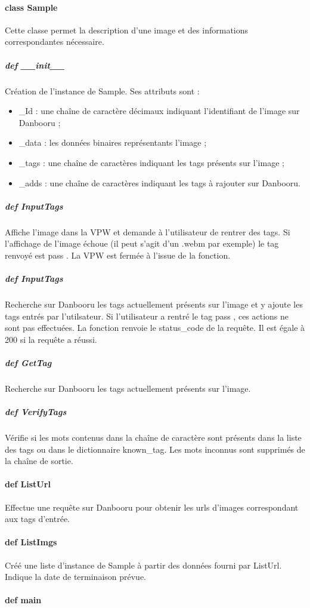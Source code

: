 \documentclass[a4paper,12pt]{article}
\begin{document}
\paragraph{class Sample}
Cette classe permet la description d'une image et des informations correspondantes nécessaire.
\subparagraph{def \_\_init\_\_}
Création de l'instance de Sample. Ses attributs sont :
\begin{itemize}
\item \_Id : une chaîne de caractère décimaux indiquant l'identifiant de l'image sur Danbooru ;
\item \_data : les données binaires représentants l'image ; 
\item \_tags : une chaîne de caractères indiquant les tags présents sur l'image ;
\item \_adds : une chaîne de caractères indiquant les tags à rajouter sur Danbooru.
\end{itemize}
\subparagraph{def InputTags}
Affiche l'image dans la VPW et demande à l'utilisateur de rentrer des tags. Si l'affichage de l'image échoue (il peut s'agit d'un .webm par exemple) le tag renvoyé est \og pass \fg. La VPW est fermée à l'issue de la fonction.
\subparagraph{def InputTags}
Recherche sur Danbooru les tags actuellement présents sur l'image et y ajoute les tags entrés par l'utilsateur. Si l'utilisateur a rentré le tag \og pass \fg, ces actions ne sont pas effectuées. La fonction renvoie le status\_code de la requête. Il est égale à 200 si la requête a réussi. 
\subparagraph{def GetTag}
Recherche sur Danbooru les tags actuellement présents sur l'image.
\subparagraph{def VerifyTags}
Vérifie si les mots contenus dans la chaîne de caractère sont présents dans la liste des tags ou dans le dictionnaire known\_tag. Les mots inconnus sont supprimés de la chaîne de sortie.
\paragraph{def ListUrl}
Effectue une requête sur Danbooru pour obtenir les urls d'images correspondant aux tags d'entrée.
\paragraph{def ListImgs}
Créé une liste d'instance de Sample à partir des données fourni par ListUrl. Indique la date de terminaison prévue.
\paragraph{def main}
\end{document}
